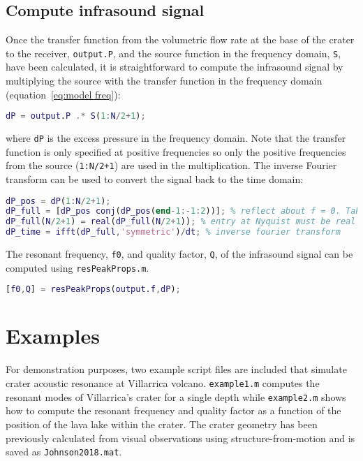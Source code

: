 \documentclass[10pt]{article}
\begin{document}
\subsection{Compute infrasound signal}
 Once the transfer function from the volumetric flow rate at the base of the crater to the receiver, \texttt{output.P}, and the source function in the frequency domain, \texttt{S}, have been calculated, it is straightforward to compute the infrasound signal by multiplying the source with the transfer function in the frequency domain (equation~\ref{eq:model freq}):
\begin{lstlisting}[language=Matlab]
dP = output.P .* S(1:N/2+1);
\end{lstlisting}
where \texttt{dP} is the excess pressure in the frequency domain. Note that the transfer function is only specified at positive frequencies so only the positive frequencies from the source (\texttt{1:N/2+1}) are used in the multiplication. The inverse Fourier transform can be used to convert the signal back to the time domain:
\begin{lstlisting}[language=Matlab]
dP_pos = dP(1:N/2+1);
dP_full = [dP_pos conj(dP_pos(end-1:-1:2))]; % reflect about f = 0. Take complex conjugate for negative frequencies
dP_full(N/2+1) = real(dP_full(N/2+1)); % entry at Nyquist must be real
dP_time = ifft(dP_full,'symmetric')/dt; % inverse fourier transform
\end{lstlisting}

The resonant frequency, \texttt{f0}, and quality factor, \texttt{Q}, of the infrasound signal can be computed using \texttt{resPeakProps.m}.
\begin{lstlisting}[language=Matlab]
[f0,Q] = resPeakProps(output.f,dP);
\end{lstlisting}



\newpage
\section{Examples}

For demonstration purposes, two example script files are included that simulate crater acoustic resonance at Villarrica volcano. \texttt{example1.m} computes the resonant modes of Villarrica's crater for a single depth while \texttt{example2.m} shows how to compute the resonant frequency and quality factor as a function of the position of the lava lake within the crater. The crater geometry has been previously calculated from visual observations using structure-from-motion \citep{Johnson2018_Villarrica} and is saved as \texttt{Johnson2018.mat}.
\end{document}
